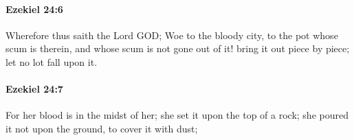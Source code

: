 		\paragraph{Ezekiel 24:6} %
			\label{EZEKIEL-24-6}

			Wherefore thus saith the Lord GOD; Woe to the bloody city, to the pot whose scum is therein, and whose scum is not gone out of it! bring it out piece by piece; let no lot fall upon it.


		\paragraph{Ezekiel 24:7} %
			\label{EZEKIEL-24-7}

			For her blood is in the midst of her; she set it upon the top of a rock; she poured it not upon the ground, to cover it with dust;


